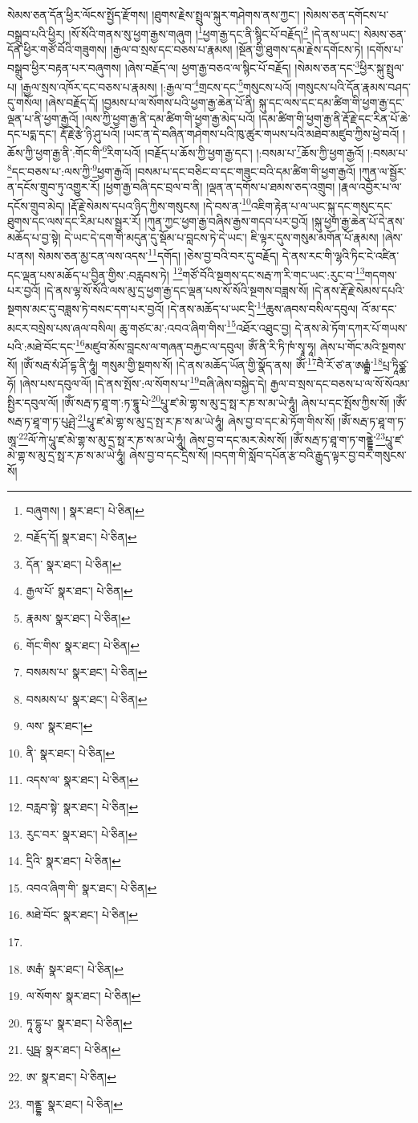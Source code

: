 སེམས་ཅན་དོན་ཕྱིར་ལོངས་སྤྱོད་རྫོགས། །ཐུགས་རྗེས་སྤྲུལ་སྐུར་གཤེགས་ནས་ཀྱང་། །སེམས་ཅན་དགོངས་པ་བསྒྲུབ་པའི་ཕྱིར། །སོ་སོའི་གནས་སུ་ཕྱག་རྒྱས་གཞུག །\footnote{བཞུགས། །  སྣར་ཐང་།  པེ་ཅིན། }ཕྱག་རྒྱ་དང་ནི་སྙིང་པོ་བརྗོད།\footnote{བརྗོད་དོ།  སྣར་ཐང་།  པེ་ཅིན། } །དེ་ནས་ཡང་། སེམས་ཅན་དོན་ཕྱིར་གཙོ་བོའི་གཟུགས། །རྒྱལ་བ་སྲས་དང་བཅས་པ་རྣམས། །སྔོན་གྱི་ཐུགས་དམ་རྗེས་དགོངས་ཏེ། །དགོས་པ་བསྒྲུབ་ཕྱིར་བརྟན་པར་བཞུགས། །ཞེས་བརྗོད་ལ། ཕྱག་རྒྱ་བཅའ་ལ་སྙིང་པོ་བརྗོད། །སེམས་ཅན་དང་\footnote{དོན་  སྣར་ཐང་།  པེ་ཅིན། }ཕྱིར་སྐུ་སྤྲུལ་པ། །རྒྱལ་སྲས་འཁོར་དང་བཅས་པ་རྣམས། །:རྒྱལ་བ་\footnote{རྒྱལ་པོ་  སྣར་ཐང་།  པེ་ཅིན། }གྲངས་དང་\footnote{རྣམས་  སྣར་ཐང་།  པེ་ཅིན། }གསུངས་པའོ། །གསུངས་པའི་དོན་རྣམས་བཤད་དུ་གསོལ། །ཞེས་བརྗོད་དོ། །བྱམས་པ་ལ་སོགས་པའི་ཕྱག་རྒྱ་ཆེན་པོ་ནི། སྐུ་དང་ལས་དང་དམ་ཚིག་གི་ཕྱག་རྒྱ་དང་ལྡན་པ་ནི་ཕྱག་རྒྱའོ། །ལས་ཀྱི་ཕྱག་རྒྱ་ནི་དམ་ཚིག་གི་ཕྱག་རྒྱ་མེད་པའོ། །དམ་ཚིག་གི་ཕྱག་རྒྱ་ནི་རྡོ་རྗེ་དང་རིན་པོ་ཆེ་དང་པདྨ་དང་། རྡོ་རྗེ་རྩེ་ཉི་ཤུ་པའོ། །ཡང་ན་དེ་བཞིན་གཤེགས་པའི་ཁུ་ཚུར་གཡས་པའི་མཐེབ་མཛུབ་ཀྱིས་ཕྱེ་བའོ། །ཆོས་ཀྱི་ཕྱག་རྒྱ་ནི་:གོང་གི་\footnote{གོང་གིས་  སྣར་ཐང་།  པེ་ཅིན། }རིག་པའོ། །བརྗོད་པ་ཆོས་ཀྱི་ཕྱག་རྒྱ་དང་། །:བསམ་པ་\footnote{བསམས་པ་  སྣར་ཐང་།  པེ་ཅིན། }ཆོས་ཀྱི་ཕྱག་རྒྱའོ། །:བསམ་པ་\footnote{བསམས་པ་  སྣར་ཐང་།  པེ་ཅིན། }དང་བཅས་པ་:ལས་ཀྱི་\footnote{ལས་  སྣར་ཐང་། }ཕྱག་རྒྱའོ། །བསམ་པ་དང་བཅིང་བ་དང་གཟུང་བའི་དམ་ཚིག་གི་ཕྱག་རྒྱའོ། །ཀུན་ལ་སྦྱོར་ན་དངོས་གྲུབ་ཏུ་འགྱུར་རོ། །ཕྱག་རྒྱ་བཞི་དང་བྲལ་བ་ནི། །ལྡན་ན་དགོས་པ་ཐམས་ཅད་འགྲུབ། །རྣལ་འབྱོར་པ་ལ་དངོས་གྲུབ་མེད། །རྡོ་རྗེ་སེམས་དཔའ་ཉིད་ཀྱིས་གསུངས། །དེ་བས་ན་\footnote{ནི་  སྣར་ཐང་།  པེ་ཅིན། }འཇིག་རྟེན་པ་ལ་ཡང་སྐུ་དང་གསུང་དང་ཐུགས་དང་ལས་དང་རིམ་པས་སྦྱར་རོ། །ཀུན་ཀྱང་ཕྱག་རྒྱ་བཞིས་རྒྱས་གདབ་པར་བྱའོ། །སྐུ་ཕྱག་རྒྱ་ཆེན་པོ་དེ་ནས་མཆོད་པ་བྱ་སྟེ། དེ་ཡང་དེ་དག་གི་མདུན་དུ་སྡོམ་པ་བླངས་ཏེ་དེ་ཡང་། ཇི་ལྟར་དུས་གསུམ་མགོན་པོ་རྣམས། །ཞེས་པ་ནས། སེམས་ཅན་མྱ་ངན་ལས་འདས་\footnote{འདས་ལ་  སྣར་ཐང་།  པེ་ཅིན། }དགོད། །ཅེས་བྱ་བའི་བར་དུ་བརྗོད། དེ་ནས་རང་གི་ལྷའི་ཏིང་ངེ་འཛིན་དང་ལྡན་པས་མཆོད་པ་བྱིན་གྱིས་:བརླབས་ཏེ། \footnote{བརླབ་སྟེ་  སྣར་ཐང་།  པེ་ཅིན། }གཙོ་བོའི་སྔགས་དང་སརྦ་ཀ་རི་གང་ཡང་:རུང་བ་\footnote{རུང་བར་  སྣར་ཐང་།  པེ་ཅིན། }གདགས་པར་བྱའོ། །དེ་ནས་ལྷ་སོ་སོའི་ལས་མུ་དྲ་ཕྱག་རྒྱ་དང་ལྡན་པས་སོ་སོའི་སྔགས་བཟླས་སོ། །དེ་ནས་རྡོ་རྗེ་སེམས་དཔའི་སྔགས་མང་དུ་བཟླས་ཏེ་བསང་དག་པར་བྱའོ། །དེ་ནས་མཆོད་པ་ཡང་དྲི་\footnote{དྲིའི་  སྣར་ཐང་།  པེ་ཅིན། }ཆུས་ཞབས་བསིལ་དབུལ། འོ་མ་དང་མངར་བསྲེས་པས་ཞལ་བསིལ། ཆུ་གཙང་མ་:འབའ་ཞིག་གིས་\footnote{འབའ་ཞིག་གི་  སྣར་ཐང་།  པེ་ཅིན། }འཐོར་འཐུང་བྱ། དེ་ནས་མེ་ཏོག་དཀར་པོ་གཡས་པའི་:མཐེ་བོང་དང་\footnote{མཐེ་བོང་  སྣར་ཐང་།  པེ་ཅིན། }མཛུབ་མོས་བླངས་ལ་གཞན་བརྐྱང་ལ་དབུལ། ཨོཾ་ནི་རི་ཏི་ཁཾ་སྭཱ་ཧཱ། ཞེས་པ་གོང་མའི་སྔགས་སོ། །ཨོཾ་སརྦ་སཾ་ཤོ་དྷ་ནི་ཧཱུཾ། གསུམ་གྱི་སྔགས་སོ། །དེ་ནས་མཆོད་ཡོན་གྱི་སྣོད་ནས། ཨོཾ་\footnote{}བཻ་རོ་ཙ་ན་ཨརྒྷཾ་\footnote{ཨརྒཾ་  སྣར་ཐང་།  པེ་ཅིན། }པྲ་ཏཱིཙྪ་ཧོ། །ཞེས་པས་དབུལ་ལོ། །དེ་ནས་སྤོས་:ལ་སོགས་པ་\footnote{ལ་སོགས་  སྣར་ཐང་།  པེ་ཅིན། }བཞི་ཞེས་བསྐྱེད་དེ། རྒྱལ་བ་སྲས་དང་བཅས་པ་ལ་སོ་སོའམ་སྤྱིར་དབུལ་ལོ། །ཨོཾ་སརྦ་ཏ་ཐཱ་ག་:ཏ་དྷཱུ་པེ་\footnote{ཏཱ་དྷུ་པ་  སྣར་ཐང་།  པེ་ཅིན། }པཱུ་ཛ་མེ་གྷ་ས་མུ་དྲ་སྥ་ར་ཎ་ས་མ་ཡེ་ཧཱུཾ། ཞེས་པ་དང་སྤོས་ཀྱིས་སོ། །ཨོཾ་སརྦ་ཏ་ཐཱ་ག་ཏ་པུཤྤེ་\footnote{པུཥྦ་  སྣར་ཐང་།  པེ་ཅིན། }པཱུ་ཛ་མེ་གྷ་ས་མུ་དྲ་སྤ་ར་ཎ་ས་མ་ཡེ་ཧཱུཾ། ཞེས་བྱ་བ་དང་མེ་ཏོག་གིས་སོ། །ཨོཾ་སརྦ་ཏ་ཐཱ་ག་ཏ་ཨཱ་\footnote{ཨ་  སྣར་ཐང་།  པེ་ཅིན། }ལོ་ཀེ་པཱུ་ཛ་མེ་གྷ་ས་མུ་དྲ་སྥ་ར་ཎ་ས་མ་ཡེ་ཧཱུཾ། ཞེས་བྱ་བ་དང་མར་མེས་སོ། །ཨོཾ་སརྦ་ཏ་ཐཱ་ག་ཏ་གནྡྷེ་\footnote{གནྡྷ་  སྣར་ཐང་།  པེ་ཅིན། }པཱུ་ཛ་མེ་གྷ་ས་མུ་དྲ་སྥ་ར་ཎ་ས་མ་ཡེ་ཧཱུཾ། ཞེས་བྱ་བ་དང་དྲིས་སོ། །བདག་གི་སློབ་དཔོན་རྩ་བའི་རྒྱུད་ལྟར་བྱ་བར་གསུངས་སོ། 
